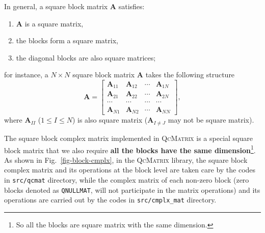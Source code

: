 \documentclass[a4paper,11pt,twoside,openright]{book}
\begin{document}
\noindent In general, a square block matrix $\mathbf{A}$ satisfies\cite{Schaum-Linear-Algebra}:
\begin{enumerate}
  \item $\mathbf{A}$ is a square matrix,
  \item the blocks form a square matrix,
  \item the diagonal blocks are also square matrices;
\end{enumerate}
for instance, a $N\times N$ square block matrix $\mathbf{A}$ takes the following structure
\begin{equation}
  \mathbf{A}=%
  \begin{bmatrix}
    \mathbf{A}_{11} & \mathbf{A}_{12} & \cdots & \mathbf{A}_{1N}\\
    \mathbf{A}_{21} & \mathbf{A}_{22} & \cdots & \mathbf{A}_{2N}\\
    \cdots & \cdots & \cdots & \cdots\\
    \mathbf{A}_{N1} & \mathbf{A}_{N2} & \cdots & \mathbf{A}_{NN}
  \end{bmatrix},
\end{equation}
where $\mathbf{A}_{II}$ ($1\le I\le N$) is also square matrix ($\mathbf{A}_{I\ne J}$
may not be square matrix).

The square block complex matrix implemented in \textsc{QcMatrix} is a special square block
matrix that we also require \textbf{all the blocks have the same dimension}\footnote{So all
the blocks are square matrix with the same dimension.}. As shown in Fig.~\ref{fig-block-cmplx},
in the \textsc{QcMatrix} library, the square block complex matrix and its operations at the
block level are taken care by the codes in \verb|src/qcmat| directory, while the complex
matrix of each non-zero block (zero blocks denoted as \verb|QNULLMAT|, will not participate
in the matrix operations) and its operations are carried out by the codes in \verb|src/cmplx_mat|
directory.
\end{document}
